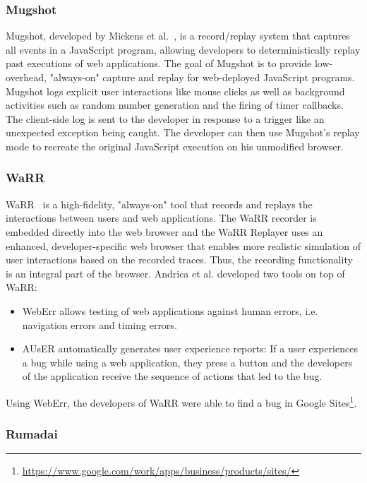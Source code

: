 \subsubsection{Mugshot}

Mugshot, developed by Mickens et al.~\cite{mugshot2010}, is a record/replay system that captures all events in a JavaScript program, allowing developers to deterministically replay past executions of web applications. The goal of Mugshot is to provide low-overhead, "always-on" capture and replay for web-deployed JavaScript programs. Mugshot logs explicit user interactions like mouse clicks as well as background activities such as random number generation and the firing of timer callbacks. The client-side log is sent to the developer in response to a trigger like an unexpected exception being caught. The developer can then use Mugshot's replay mode to recreate the original JavaScript execution on his unmodified browser. 

\subsubsection{WaRR}

WaRR~\cite{warr2011} is a high-fidelity, "always-on" tool that records and replays the interactions between users and web applications. The WaRR recorder is embedded directly into the web browser and the WaRR Replayer uses an enhanced, developer-specific web browser that enables more realistic simulation of user interactions based on the recorded traces. Thus, the recording functionality is an integral part of the browser. Andrica et al. developed two tools on top of WaRR:
\begin{itemize}
	\item WebErr allows testing of web applications against human errors, i.e. navigation errors and timing errors.
	\item AUsER automatically generates user experience reports: If a user experiences a bug while using a web application, they press a button and the developers of the application receive the sequence of actions that led to the bug.
\end{itemize}
Using WebErr, the developers of WaRR were able to find a bug in Google Sites\footnote{\url{https://www.google.com/work/apps/business/products/sites/}}.

\subsubsection{Rumadai}

